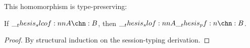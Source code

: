 %
This homomorphism is type-preserving:
\begin{theorem}
  If $\slcof{A |- \chn : B}$, then $\slof{A |- \pf{\chn} : B}$.
\end{theorem}
\begin{proof}
  By structural induction on the session-typing derivation.
\end{proof}



 

 




